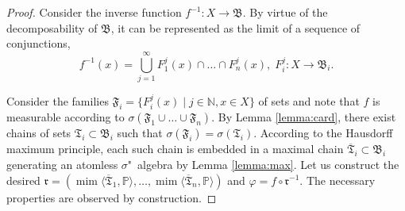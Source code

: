 \begin{proof}
	Consider the inverse function $f^{-1} : X \rightarrow \mathfrak{B}$. By virtue of the decomposability of $\mathfrak{B}$, it can be represented as the limit of a sequence of conjunctions, %
	\begin{equation*}
		f^{-1}(x) = \bigcup_{j=1}^\infty F_1^j(x) \cap \ldots \cap F_n^j(x), \; F_i^j : X \rightarrow \mathfrak{B}_i.
	\end{equation*}
	
	Consider the families $\mathfrak{F}_i = \{F_i^j(x) \mid j \in \mathbb{N}, x \in X\}$ of sets and note that $f$ is measurable according to $\sigma(\mathfrak{F}_1 \cup \ldots \cup \mathfrak{F}_n)$. By Lemma \ref{lemma:card}, there exist chains of sets $\mathfrak{T}_i \subset \mathfrak{B}_i$ such that $\sigma(\mathfrak{F}_i) = \sigma(\mathfrak{T}_i)$. According to the Hausdorff maximum principle, each such chain is embedded in a maximal chain $\overline{\mathfrak{T}}_i \subset \mathfrak{B}_i$ generating an atomless $\sigma$"~algebra by Lemma \ref{lemma:max}. Let us construct the desired $\mathfrak{r} = (\operatorname{mim}\langle\overline{\mathfrak{T}}_1, \mathbb{P}\rangle, \ldots, \operatorname{mim}\langle\overline{\mathfrak{T}}_n, \mathbb{P}\rangle)$ and $\varphi = f \circ \mathfrak{r}^{-1}$. The necessary properties are observed by construction. %
\end{proof}

